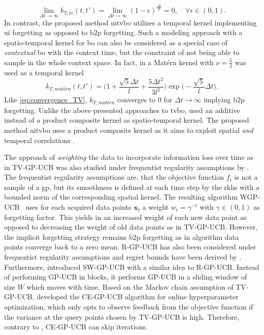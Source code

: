 \begin{equation}
    \lim_{\Delta t \to \infty} k_{T,tv}(t, t') = \lim_{\Delta t \to \infty} (1-\epsilon)^{\frac{\Delta t}{2}} = 0, \quad \forall \epsilon \in (0,1).
    \label{eq:convergence_TV}
\end{equation}
In contrast, the proposed method \gls{uitvbo} utilizes a temporal kernel implementing \gls{ui} forgetting as opposed to \gls{b2p} forgetting. Such a modeling approach with a spatio-temporal kernel for \gls{bo} can also be considered as a special case of \emph{contextual} \gls{bo} \cite{Krause_2011} with the context time, but the constraint of not being able to sample in the whole context space. In fact, in \textcite[Section~5.3 and Section~6.2]{Krause_2011} a Matérn kernel with $\nu = \frac{5}{2}$ was used as a temporal kernel
\begin{equation}
    k_{T,matérn}(t, t')=\Bigg( 1+ \frac{\sqrt{5}\Delta t}{l} + \frac{5\Delta t^2}{3l^2}\Bigg) \exp\Bigg(-{\frac{\sqrt{5}}{l} \Delta t}\Bigg).
    \label{eq:temporal_matern_kernel}
\end{equation}
Like \eqref{eq:convergence_TV}, $k_{T,matérn}$ converges to $0$ for $\Delta t \to \infty$ implying \gls{b2p} forgetting. Unlike the above presented approaches to \gls{tvbo}, \textcite{Baheri_2017} used an additive instead of a product composite kernel as spatio-temporal kernel. The proposed method \gls{uitvbo} uses a product composite kernel as it aims to exploit spatial \emph{and} temporal correlations \cite[Section~4.2.4]{Rasmussen_2006}.

The approach of \emph{weighting} the data to incorporate information loss over time as in TV-GP-UCB was also studied under frequentist regularity assumptions by \textcite{Deng_2021}. The frequentist regularity assumptions are, that the objective function $f_t$ is not a sample of a \gls{gp}, but its smoothness is defined at each time step by the \gls{rkhs} with a bounded norm of the corresponding spatial kernel. The resulting algorithm WGP-UCB~\cite{Deng_2021} uses for each acquired data points $\mathbf{x}_t$ a weight $w_t=\gamma^{-t}$ with $\gamma \in (0,1)$ as forgetting factor. This yields in an increased weight of each new data point as opposed to decreasing the weight of old data points as in TV-GP-UCB. However, the implicit forgetting strategy remains \gls{b2p} forgetting as in algorithm data points converge back to a zero mean. R-GP-UCB has also been considered under frequentist regularity assumptions and regret bounds have been derived by \textcite{Zhou_2021}. Furthermore, \textcite{Zhou_2021} introduced SW-GP-UCB with a similar idea to R-GP-UCB. Instead of performing GP-UCB in blocks, it performs GP-UCB in a sliding window of size $W$ which moves with time.
Based on the Markov chain assumption of TV-GP-UCB, \textcite{Wang_2021} developed the CE-GP-UCB algorithm for online hyperparameter optimization, which only opts to observe feedback from the objective function if the variance at the query points chosen by TV-GP-UCB is high. Therefore, contrary to , CE-GP-UCB can skip iterations.

